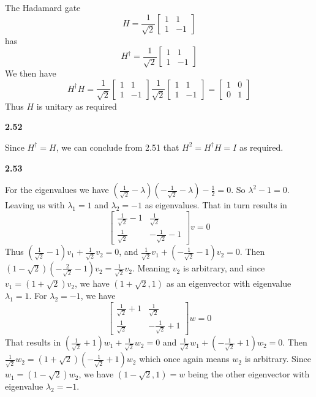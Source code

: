 The Hadamard gate 
\[H = \frac{1}{\sqrt{2}}
\begin{bmatrix}
    1 & 1 \\
    1 & -1
\end{bmatrix}\]
has \[H^\dag = \frac{1}{\sqrt{2}}
\begin{bmatrix}
    1 & 1 \\
    1 & -1
\end{bmatrix}\]
We then have 
\[H^\dag H =\frac{1}{\sqrt{2}}
\begin{bmatrix}
    1 & 1 \\
    1 & -1
\end{bmatrix} \frac{1}{\sqrt{2}}\begin{bmatrix}
    1 & 1 \\
    1 & -1
\end{bmatrix} =\begin{bmatrix}
    1 & 0 \\
    0 & 1
\end{bmatrix}  \]
Thus $H $ is unitary as required

\textbf{2.52}

Since $H^\dag =H$, we can conclude from 2.51 that $H^2 = H^\dag H = I$ as required.

\textbf{2.53}

For the eigenvalues we have $ (\frac{1}{\sqrt{2}}-\lambda)(-\frac{1}{\sqrt{2}}-\lambda) - \frac{1}{2} = 0$. So $ \lambda^2-1 = 0$. Leaving us with $ \lambda_1 = 1$ and $\lambda_2 = -1$ as eigenvalues. That in turn results in \[\begin{bmatrix}
    \frac{1}{\sqrt{2}} - 1 & \frac{1}{\sqrt{2}}\\
    \frac{1}{\sqrt{2}} & -\frac{1}{\sqrt{2}} - 1
\end{bmatrix}
v = 0\]
Thus $ (\frac{1}{\sqrt{2}}-1)v_1  + \frac{1}{\sqrt{2}}v_2 = 0 $, and $ \frac{1}{\sqrt{2}}v_1 +(-\frac{1}{\sqrt{2}} -1)v_2 = 0$. Then $(1-\sqrt{2})(-\frac{2}{\sqrt{2}} -1)v_2 = \frac{1}{\sqrt{2}}v_2$. Meaning $v_2$ is arbitrary, and since $ v_1 = (1+\sqrt{2})v_2$, we have $ (1+\sqrt{2},1)$ as an eigenvector with eigenvalue $ \lambda_1 = 1$. For $\lambda_2 = -1$, we have 
\[
\begin{bmatrix}
    \frac{1}{\sqrt{2}} + 1 & \frac{1}{\sqrt{2}}\\
    \frac{1}{\sqrt{2}} & -\frac{1}{\sqrt{2}} + 1
\end{bmatrix}
w = 0
\]
That results in $(\frac{1}{\sqrt{2}}+1)w_1  + \frac{1}{\sqrt{2}}w_2 = 0$ and $ \frac{1}{\sqrt{2}}w_1 +(-\frac{1}{\sqrt{2}} +1)w_2 = 0$. Then $ \frac{1}{\sqrt{2}}w_2 = (1+\sqrt{2})(-\frac{1}{\sqrt{2}} +1)w_2$ which once again means $w_2$ is arbitrary. Since $ w_1=(1 -\sqrt{2})w_2$, we have $ (1-\sqrt{2}, 1) = w$ being the other eigenvector with eigenvalue $\lambda_2 = -1$.

